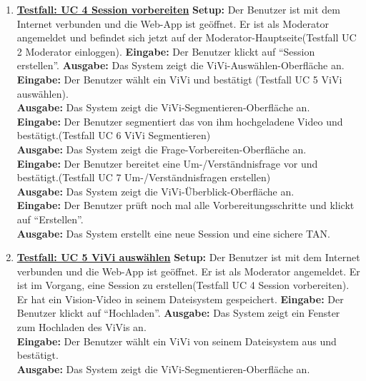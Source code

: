 \begin{enumerate}
	\item \underline{\textbf{Testfall: UC 4 Session vorbereiten}} \linebreak
	\textbf{Setup:} Der Benutzer ist mit dem Internet verbunden und die Web-App ist geöffnet. Er ist als Moderator angemeldet und befindet sich jetzt auf der Moderator-Hauptseite(Testfall UC 2 Moderator einloggen).\linebreak
	\textbf{Eingabe:} Der Benutzer klickt auf ``Session erstellen''.\linebreak
	\textbf{Ausgabe:} Das System zeigt die ViVi-Auswählen-Oberfläche an. \\
	\textbf{Eingabe:} Der Benutzer wählt ein ViVi und bestätigt (Testfall UC 5 ViVi auswählen).\\
	\textbf{Ausgabe:} Das System zeigt die ViVi-Segmentieren-Oberfläche an. \\
	\textbf{Eingabe:} Der Benutzer segmentiert das von ihm hochgeladene Video und bestätigt.(Testfall UC 6 ViVi Segmentieren)\\
	\textbf{Ausgabe:} Das System zeigt die Frage-Vorbereiten-Oberfläche an.\\
	\textbf{Eingabe:} Der Benutzer bereitet eine Um-/Verständnisfrage vor und bestätigt.(Testfall UC 7 Um-/Verständnisfragen erstellen)\\
	\textbf{Ausgabe:} Das System zeigt die ViVi-Überblick-Oberfläche an.\\
	\textbf{Eingabe:} Der Benutzer prüft noch mal alle Vorbereitungsschritte und klickt auf ``Erstellen''.\\
	\textbf{Ausgabe:} Das System erstellt eine neue Session und eine sichere TAN.
	
	\item \underline{\textbf{Testfall: UC 5 ViVi auswählen}} \linebreak
	\textbf{Setup:} Der Benutzer ist mit dem Internet verbunden und die Web-App ist geöffnet. Er ist als Moderator angemeldet. Er ist im Vorgang, eine Session zu erstellen(Testfall UC 4 Session vorbereiten). Er hat ein Vision-Video in seinem Dateisystem gespeichert. \linebreak
	\textbf{Eingabe:} Der Benutzer klickt auf ``Hochladen''. \linebreak
	\textbf{Ausgabe:} Das System zeigt ein Fenster zum Hochladen des ViVis an.\\
	\textbf{Eingabe:} Der Benutzer wählt ein ViVi von seinem Dateisystem aus und bestätigt.\\
	\textbf{Ausgabe:} Das System zeigt die ViVi-Segmentieren-Oberfläche an.
	

\end{enumerate}
